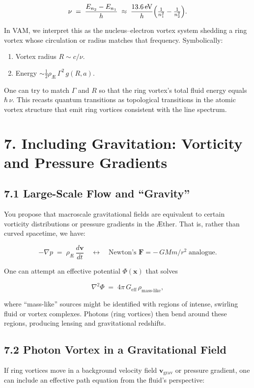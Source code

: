 \[
 \nu \;=\; \frac{E_{n_2}-E_{n_1}}{h} \;\approx\; \frac{13.6\,\mathrm{eV}}{h} \Bigl(\tfrac{1}{n_1^2}-\tfrac{1}{n_2^2}\Bigr).
\]

In VAM, we interpret this as the nucleus–electron vortex system shedding a ring vortex whose circulation or radius matches that frequency. Symbolically:

\begin{enumerate}
 \item Vortex radius \(R \sim c/\nu\).
 \item Energy \(\sim \tfrac12 \rho_{\scriptscriptstyle\mathrm{Æ}}\,\Gamma^2\,g(R,a)\).
\end{enumerate}

One can try to match \(\Gamma\) and \(R\) so that the ring vortex’s total fluid energy equals \(\hbar\,\nu\). This recasts quantum transitions as topological transitions in the atomic vortex structure that emit ring vortices consistent with the line spectrum.

\section*{7. Including Gravitation: Vorticity and Pressure Gradients}
\subsection*{7.1 Large-Scale Flow and “Gravity”}
You propose that macroscale gravitational fields are equivalent to certain vorticity distributions or pressure gradients in the Æther. That is, rather than curved spacetime, we have:

\[
 -\nabla p \;=\; \rho_{\scriptscriptstyle \mathrm{Æ}}\, \frac{d\mathbf{v}}{dt} \quad\longleftrightarrow\quad \text{Newton’s } \mathbf{F}=-\,GMm/r^2\;\text{analogue}.
\]

One can attempt an effective potential \(\Phi(\mathbf{x})\) that solves

\[
 \nabla^2 \Phi \;=\; 4\pi\,G_{\text{eff}}\,\rho_{\text{mass-like}},
\]

where “mass-like” sources might be identified with regions of intense, swirling fluid or vortex complexes. Photons (ring vortices) then bend around these regions, producing lensing and gravitational redshifts.

\subsection*{7.2 Photon Vortex in a Gravitational Field}
If ring vortices move in a background velocity field \(\mathbf{v}_{\mathrm{grav}}\) or pressure gradient, one can include an effective path equation from the fluid’s perspective:

